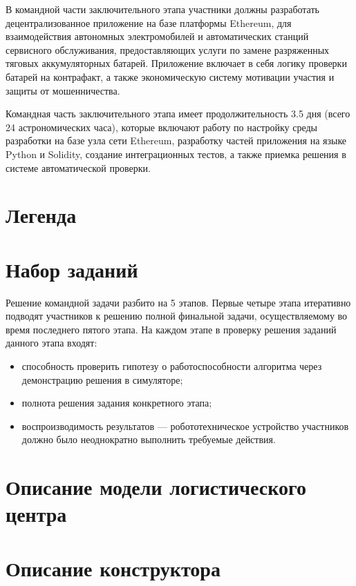 В командной части заключительного этапа участники должны
разработать децентрализованное приложение на базе платформы Ethereum,
для взаимодействия автономных электромобилей и автоматических станций
сервисного
обслуживания, предоставляющих услуги по замене разряженных  
тяговых аккумуляторных батарей. Приложение включает в себя логику
проверки батарей на контрафакт, а также экономическую систему мотивации
участия и защиты от мошенничества.

Командная часть заключительного этапа имеет продолжительность
3.5 дня (всего 24 астрономических часа), которые включают работу по
настройку среды разработки на базе узла сети Ethereum, разработку
частей приложения на языке Python и Solidity, создание интеграционных
тестов, а также приемка решения в системе автоматической проверки.

\section{Легенда}


\section{Набор заданий}

Решение командной задачи разбито на 5 этапов. Первые четыре
этапа итеративно подводят участников к решению полной финальной
задачи, осуществляемому во время последнего пятого этапа. На
каждом этапе в проверку решения заданий данного этапа входят:
\begin{itemize}
    \item способность проверить гипотезу о работоспособности алгоритма
    через демонстрацию решения в симуляторе;
    \item полнота решения задания конкретного этапа;
    \item воспроизводимость результатов --- робототехническое
    устройство участников должно было неоднократно выполнить требуемые
    действия.
\end{itemize}



\section{Описание модели логистического центра}


\section{Описание конструктора}


